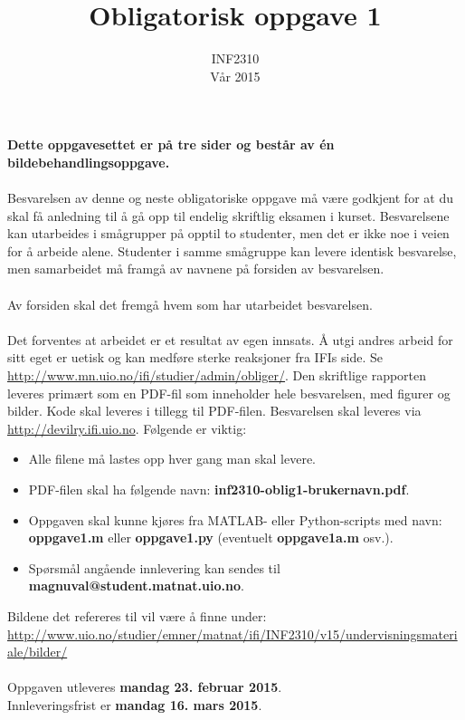 \documentclass[11pt,a4paper]{article}
\title{Obligatorisk oppgave 1}
\author{INF2310 \\ Vår 2015}
\begin{document}
\maketitle{}

\textbf{Dette oppgavesettet er på tre sider og består av én bildebehandlingsoppgave.}
\\
\\
Besvarelsen av denne og neste obligatoriske oppgave må være godkjent for at du skal
få anledning til å gå opp til endelig skriftlig eksamen i kurset.
Besvarelsene kan utarbeides i smågrupper på opptil to studenter, men det er ikke
noe i veien for å arbeide alene. Studenter i samme smågruppe kan levere identisk
besvarelse, men samarbeidet må framgå av navnene på forsiden av besvarelsen.\\
\\
Av forsiden skal det fremgå hvem som har utarbeidet besvarelsen.
\\
\\
Det forventes at arbeidet er et resultat av egen innsats.
Å utgi andres arbeid for sitt eget er uetisk og kan medføre sterke reaksjoner fra IFIs
side. Se \\\href{http://www.mn.uio.no/ifi/studier/admin/obliger/}{http://www.mn.uio.no/ifi/studier/admin/obliger/}.
Den skriftlige rapporten leveres primært som en PDF-fil som inneholder hele
besvarelsen, med figurer og bilder. Kode skal leveres i tillegg til PDF-filen.
Besvarelsen skal leveres via \href{http://devilry.ifi.uio.no}{http://devilry.ifi.uio.no}. 
Følgende er viktig:

\begin{itemize}
\item Alle filene må lastes opp hver gang man skal levere.
\item PDF-filen skal ha følgende navn: \textbf{inf2310-oblig1-brukernavn.pdf}.
\item Oppgaven skal kunne kjøres fra MATLAB- eller Python-scripts med navn:
\textbf{oppgave1.m} eller \textbf{oppgave1.py} (eventuelt \textbf{oppgave1a.m} osv.).
\item Spørsmål angående innlevering kan sendes til \\\textbf{magnuval@student.matnat.uio.no}.
\end{itemize}

Bildene det refereres til vil være å finne under:\\
\href{http://www.uio.no/studier/emner/matnat/ifi/INF2310/v15/undervisningsmateriale/bilder/}{http://www.uio.no/studier/emner/matnat/ifi/INF2310/v15/undervisningsmateriale/bilder/}
~
\\ 
~
\\
Oppgaven utleveres \textbf{mandag 23. februar 2015}.\\
Innleveringsfrist er \textbf{mandag 16. mars 2015}.
\end{document}
